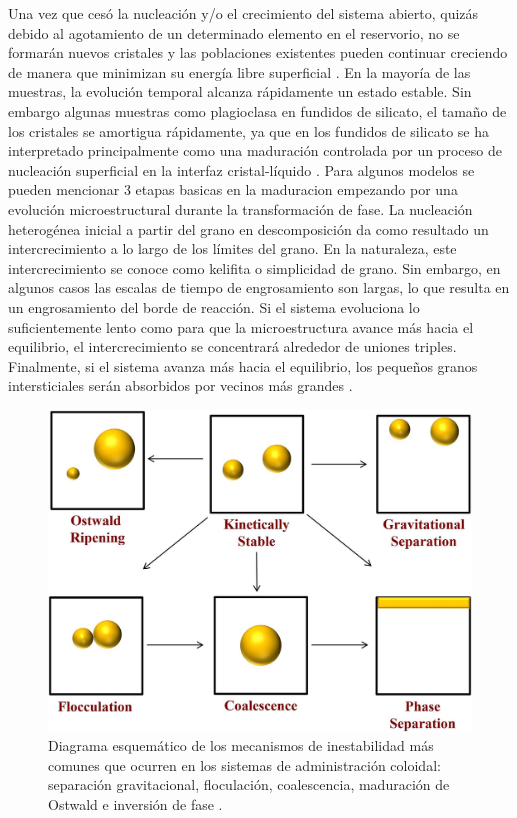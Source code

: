 \documentclass[3pt,twocolumn]{elsarticle}
\begin{document}
Una vez que cesó la nucleación y/o el crecimiento del sistema abierto, quizás debido al agotamiento de un determinado elemento en el reservorio, no se formarán nuevos cristales y las poblaciones existentes pueden continuar creciendo de manera que minimizan su energía libre superficial \cite{a2}.
En la mayoría de las muestras, la evolución temporal alcanza rápidamente un estado estable. Sin embargo algunas muestras como plagioclasa en fundidos de silicato, el tamaño de los cristales se amortigua rápidamente, ya que en los fundidos de silicato se ha interpretado principalmente como una maduración controlada por un proceso de nucleación superficial en la interfaz cristal-líquido \cite{a3}.
Para algunos modelos se pueden mencionar 3 etapas basicas en la maduracion empezando por una evolución microestructural durante la transformación de fase. La nucleación heterogénea inicial a partir del grano en descomposición da como resultado un intercrecimiento a lo largo de los límites del grano. En la naturaleza, este intercrecimiento se conoce como kelifita o simplicidad de grano. Sin embargo, en algunos casos las escalas de tiempo de engrosamiento son largas, lo que resulta en un engrosamiento del borde de reacción. Si el sistema evoluciona lo suficientemente lento como para que la microestructura avance más hacia el equilibrio, el intercrecimiento se concentrará alrededor de uniones triples. Finalmente, si el sistema avanza más hacia el equilibrio, los pequeños granos intersticiales serán absorbidos por vecinos más grandes
\cite{a5}.
	\begin{figure}[h!]
				\centering
				\includegraphics[scale=0.7]{ostwlad.jpeg} 
				\caption{Diagrama esquemático de los mecanismos de inestabilidad más comunes que ocurren en los sistemas de administración coloidal: separación gravitacional, floculación, coalescencia, maduración de Ostwald e inversión de fase \cite{a1}.}
		\label{ostwlad}
\end{figure}
\end{document}
